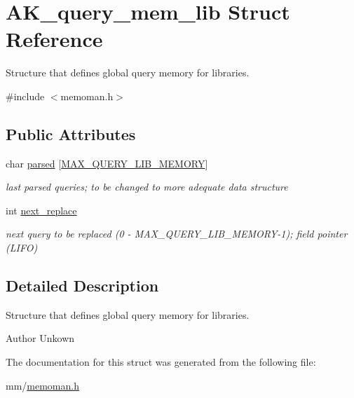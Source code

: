 \hypertarget{structAK__query__mem__lib}{}\section{A\+K\+\_\+query\+\_\+mem\+\_\+lib Struct Reference}
\label{structAK__query__mem__lib}


Structure that defines global query memory for libraries.  




{\ttfamily \#include $<$memoman.\+h$>$}

\subsection*{Public Attributes}
\begin{DoxyCompactItemize}
\item 
\mbox{\label{structAK__query__mem__lib_ad9f1f83f9132d56bfe652891b303f73a}} 
char \hyperlink{structAK__query__mem__lib_ad9f1f83f9132d56bfe652891b303f73a}{parsed} \mbox{[}\hyperlink{constants_8h_a5f6f30aaf2c1db6c11d973eb68bb1ab6}{M\+A\+X\+\_\+\+Q\+U\+E\+R\+Y\+\_\+\+L\+I\+B\+\_\+\+M\+E\+M\+O\+RY}\mbox{]}
\begin{DoxyCompactList}\small\item\em last parsed queries; to be changed to more adequate data structure \end{DoxyCompactList}\item 
\mbox{\label{structAK__query__mem__lib_ab7a0a03ba936eabe2a9a11c74fa0d385}} 
int \hyperlink{structAK__query__mem__lib_ab7a0a03ba936eabe2a9a11c74fa0d385}{next\+\_\+replace}
\begin{DoxyCompactList}\small\item\em next query to be replaced (0 -\/ M\+A\+X\+\_\+\+Q\+U\+E\+R\+Y\+\_\+\+L\+I\+B\+\_\+\+M\+E\+M\+O\+R\+Y-\/1); field pointer (L\+I\+FO) \end{DoxyCompactList}\end{DoxyCompactItemize}


\subsection{Detailed Description}
Structure that defines global query memory for libraries. 

\begin{DoxyAuthor}{Author}
Unkown 
\end{DoxyAuthor}


The documentation for this struct was generated from the following file\+:\begin{DoxyCompactItemize}
\item 
mm/\hyperlink{memoman_8h}{memoman.\+h}\end{DoxyCompactItemize}
